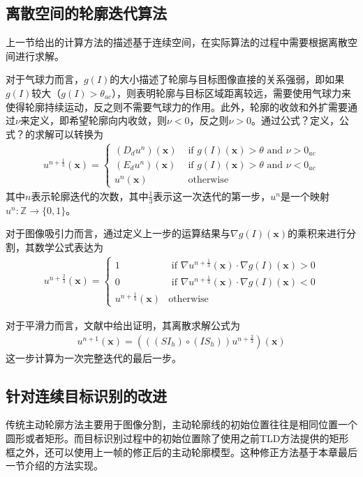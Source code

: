 \subsection{离散空间的轮廓迭代算法}
上一节给出的计算方法的描述基于连续空间，在实际算法的过程中需要根据离散空间进行求解。

对于气球力而言，$g(I)$的大小描述了轮廓与目标图像直接的关系强弱，即如果$g(I)$较大（$g(I)>\theta_{ac}$），则表明轮廓与目标区域距离较远，需要使用气球力来使得轮廓持续运动，反之则不需要气球力的作用。此外，轮廓的收敛和外扩需要通过$\nu$来定义，即希望轮廓向内收敛，则$\nu<0$，反之则$\nu>0$。通过公式？定义，公式？的求解可以转换为
\begin{align}
u^{n+\frac{1}{3}}(\mathbf{x})=\left\{ \begin{array}{ll}
(D_du^n)(\mathbf{x}) &\mbox{ if $g(I)(\mathbf{x})>\theta$ and $\nu>0_{ac}$} \\
(E_du^n)(\mathbf{x}) &\mbox{ if $g(I)(\mathbf{x})>\theta$ and $\nu<0_{ac}$} \\
u^{n}(\mathbf{x}) &\mbox{ otherwise}
\end{array} \right.
\end{align}
其中$n$表示轮廓迭代的次数，其中$\frac{1}{3}$表示这一次迭代的第一步，$u^n$是一个映射$u^n:\mathbb{Z} \rightarrow \{0, 1\}$。

对于图像吸引力而言，通过定义上一步的运算结果与$ \nabla g(I)(\mathbf{x}) $的乘积来进行分割，其数学公式表达为
\begin{align}
u^{n+\frac{2}{3}}(\mathbf{x})=\left\{ \begin{array}{ll}
1 &\mbox{ if $\nabla u^{n+\frac{1}{3}}(\mathbf{x}) \cdot \nabla g(I)(\mathbf{x}) > 0$} \\
0&\mbox{ if $\nabla u^{n+\frac{1}{3}}(\mathbf{x}) \cdot \nabla g(I)(\mathbf{x}) < 0$} \\
u^{n+\frac{1}{3}}(\mathbf{x}) &\mbox{otherwise}
\end{array} \right.
\end{align}

对于平滑力而言，文献中给出证明，其离散求解公式为
\begin{align}
u^{n+1} (\mathbf{x}) = (((SI_h) \circ (IS_h)) u^{n+\frac{2}{3}})(\mathbf{x})
\end{align}
这一步计算为一次完整迭代的最后一步。

\subsection{针对连续目标识别的改进}
传统主动轮廓方法主要用于图像分割，主动轮廓线的初始位置往往是相同位置一个圆形或者矩形。而目标识别过程中的初始位置除了使用之前TLD方法提供的矩形框之外，还可以使用上一帧的修正后的主动轮廓模型。这种修正方法基于本章最后一节介绍的方法实现。

